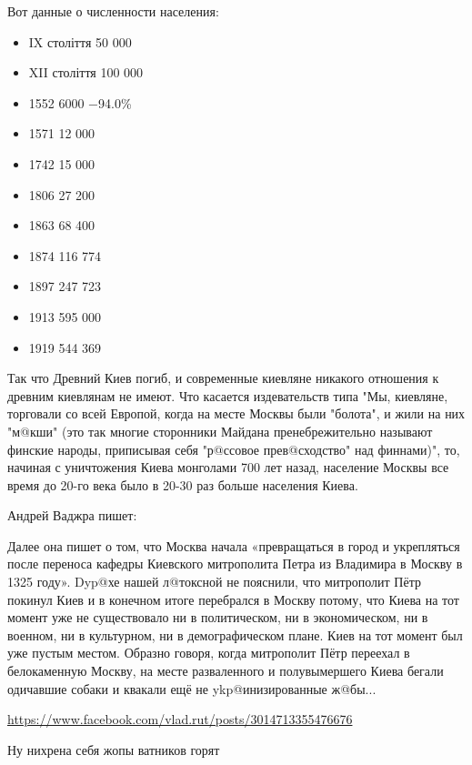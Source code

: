 \begin{itemize}
Вот данные о численности населения:

\begin{itemize}
  \item IX століття 50 000
  \item XII століття 100 000
  \item 1552 6000 −94.0\%
  \item 1571 12 000
  \item 1742 15 000
  \item 1806 27 200
  \item 1863 68 400
  \item 1874 116 774
  \item 1897 247 723
  \item 1913 595 000
  \item 1919 544 369
\end{itemize}

Так что Древний Киев погиб, и современные киевляне никакого отношения к древним
киевлянам не имеют. Что касается издевательств типа "Мы, киевляне, торговали со
всей Европой, когда на месте Москвы были "болота", и жили на них "м@кши" (это
так многие сторонники Майдана пренебрежительно называют финские народы,
приписывая себя "р@ссовое прев@сходство" над финнами)", то, начиная с
уничтожения Киева монголами 700 лет назад, население Москвы все время до 20-го
века было в 20-30 раз больше населения Киева.

Андрей Ваджра пишет:

Далее она пишет о том, что Москва начала «превращаться в город и укрепляться
после переноса кафедры Киевского митрополита Петра из Владимира в Москву в 1325
году». Dyp@хе нашей л@токсной не пояснили, что митрополит Пётр покинул Киев и в
конечном итоге перебрался в Москву потому, что Киева на тот момент уже не
существовало ни в политическом, ни в экономическом, ни в военном, ни в
культурном, ни в демографическом плане. Киев на тот момент был уже пустым
местом. Образно говоря, когда митрополит Пётр переехал в белокаменную Москву,
на месте разваленного и полувымершего Киева бегали одичавшие собаки и квакали
ещё не ykp@инизированные ж@бы...

\url{https://www.facebook.com/vlad.rut/posts/3014713355476676}

 
Ну нихрена себя жопы ватников горят \Smiley[1.0][yellow]


\end{itemize}
